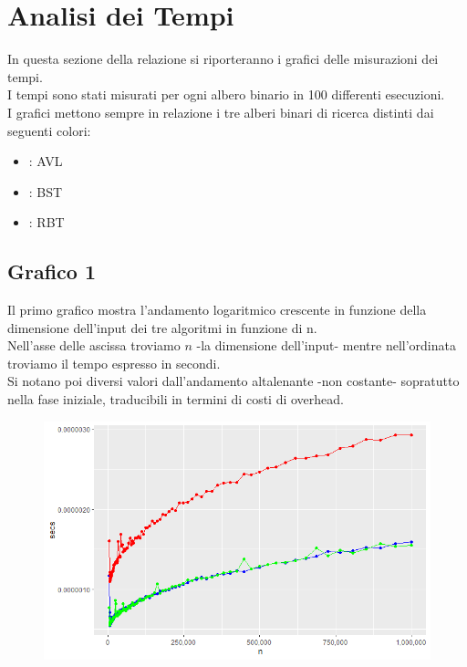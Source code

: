\documentclass[a4paper,11pt]{report}
\begin{document}
    \chapter{Analisi dei Tempi}
    In questa sezione della relazione si riporteranno i grafici delle misurazioni dei tempi.
    \\I tempi sono stati misurati per ogni albero binario in 100 differenti esecuzioni. %
    \\I grafici mettono sempre in relazione i tre alberi binari di ricerca distinti dai seguenti colori:
    \begin{itemize}
        \item {\color{Red}{Rosso}}: AVL
        \item {\color{Blue}{Blu}}: BST
        \item {\color{Green}{Verde}}: RBT
    \end{itemize}


    \section{Grafico 1}
    Il primo grafico mostra l'andamento logaritmico crescente in funzione della dimensione dell'input dei tre algoritmi in funzione di n.
    \\Nell’asse delle ascissa troviamo $n$ -la dimensione dell'input- mentre nell’ordinata troviamo il tempo espresso in secondi.
    \\Si notano poi diversi valori dall'andamento altalenante -non costante- sopratutto nella fase iniziale, traducibili in termini di costi di overhead.\\

    \begin{figure}[h!]
        \begin{center}
            \includegraphics[width=16cm]{img/giusto1}\\
        \end{center}
    \end{figure}
    \pagebreak
\end{document}
